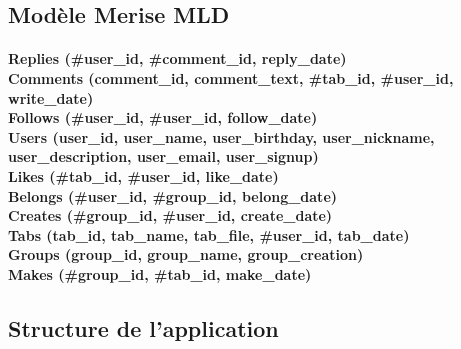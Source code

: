 \documentclass[a4paper]{article}
\begin{document}
\subsection{Modèle Merise MLD}
\paragraph{Replies (\#user\_id, \#comment\_id, reply\_date) \\
Comments (comment\_id, comment\_text, \#tab\_id, \#user\_id, write\_date) \\
Follows (\#user\_id, \#user\_id, follow\_date) \\
Users (user\_id, user\_name, user\_birthday, user\_nickname, user\_description, user\_email, user\_signup) \\
Likes (\#tab\_id, \#user\_id, like\_date) \\
Belongs (\#user\_id, \#group\_id, belong\_date) \\
Creates (\#group\_id, \#user\_id, create\_date) \\
Tabs (tab\_id, tab\_name, tab\_file, \#user\_id, tab\_date) \\
Groups (group\_id, group\_name, group\_creation) \\
Makes (\#group\_id, \#tab\_id, make\_date) \\
}
\subsection{Structure de l'application}
\end{document}
